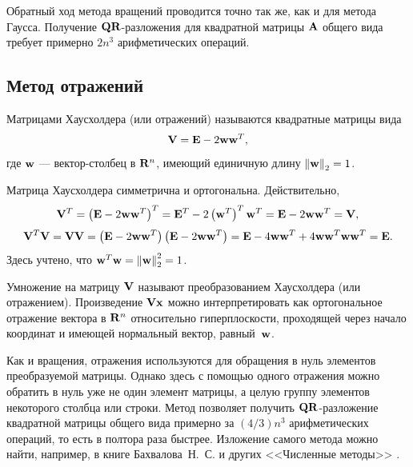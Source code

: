 \documentclass[12pt]{article}
\begin{document}
	Обратный ход метода вращений проводится точно так же, как и для метода Гаусса. Получение $\bold{QR}$-разложения для квадратной матрицы $\bold{A}$ общего вида требует примерно $2n^3$ арифметических операций.
 	
    \subsection*{Метод отражений}
    
    Матрицами Хаусхолдера (или отражений) называются квадратные матрицы вида
    \begin{equation}
    	\bold{V}=\bold{E}-2\bold{ww}^{T},
    \end{equation}
    где $\bold{w}$ --- вектор-столбец в $\bold{R}^n$, имеющий единичную длину $\left\|\bold{w}\right\|_2=1$.
    
    Матрица Хаусхолдера симметрична и ортогональна. Действительно,
    \begin{equation}
    	\bold{V}^{T}=\left(\bold{E}-2\bold{ww}^T\right)^T=\bold{E}^T-2\left(\bold{w}^T\right)^T\bold{w}^{T}=\bold{E}-2\bold{w}\bold{w}^{T}=\bold{V},
    \end{equation} 
    \begin{equation}
    	\bold{V}^T\bold{V}=\bold{VV}=\left(\bold{E}-2\bold{ww}^{T}\right)\left(\bold{E}-2\bold{ww}^{T}\right)=\bold{E}-4\bold{ww}^{T}+4\bold{ww}^T\bold{ww}^T=\bold{E}.
    \end{equation}
    Здесь учтено, что $\bold{w}^T\bold{w}=\left\|\bold{w}\right\|_2^2=1$.
    
    Умножение на матрицу $\bold{V}$ называют преобразованием Хаусхолдера (или отражением). Произведение $\bold{V}\bold{x}$ можно интерпретировать как ортогональное отражение вектора в $\bold{R}^n$ относительно гиперплоскости, проходящей через начало координат и имеющей нормальный вектор, равный~$\bold{w}$.
    
    Как и вращения, отражения используются для обращения в нуль элементов преобразуемой матрицы. Однако здесь с помощью одного отражения можно обратить в нуль уже не один элемент матрицы, а целую группу элементов некоторого столбца или строки. Метод позволяет получить $\bold{QR}$-разложение квадратной матрицы общего вида примерно за $\left(4/3\right)n^3$ арифметических операций, то есть в полтора раза быстрее. Изложение самого метода можно найти, например, в книге Бахвалова~Н.~С. и других <<Численные методы>> \cite{Bch}.
    
\end{document}
